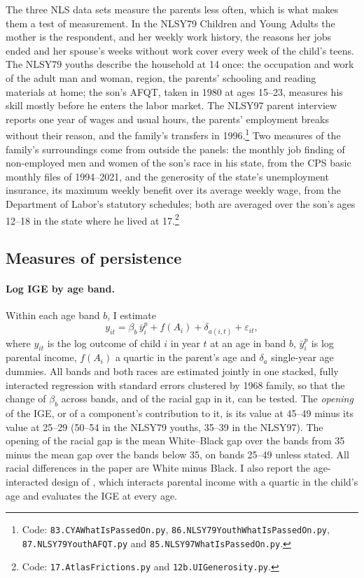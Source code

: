 The three NLS data sets measure the parents less often, which is what makes them a test of measurement. In the NLSY79
Children and Young Adults the mother is the respondent, and her weekly work history, the reasons her jobs ended and her
spouse's weeks without work cover every week of the child's teens. The NLSY79 youths describe the household at 14 once:
the occupation and work of the adult man and woman, region, the parents' schooling and reading materials at home; the
son's AFQT, taken in 1980 at ages 15--23, measures his skill mostly before he enters the labor market. The NLSY97 parent interview reports
one year of wages and usual hours, the parents' employment breaks without their reason, and the family's transfers in
1996.\footnote{Code: \texttt{83.CYAWhatIsPassedOn.py}, \texttt{86.NLSY79YouthWhatIsPassedOn.py},
\texttt{87.NLSY79YouthAFQT.py} and \texttt{85.NLSY97WhatIsPassedOn.py}.} Two measures of the family's surroundings
come from outside the panels: the monthly job finding of non-employed men and women of the son's race in his state,
from the CPS basic monthly files of 1994--2021, and the generosity of the state's unemployment insurance, its maximum
weekly benefit over its average weekly wage, from the Department of Labor's statutory schedules; both are averaged over
the son's ages 12--18 in the state where he lived at 17.\footnote{Code: \texttt{17.AtlasFrictions.py} and
\texttt{12b.UIGenerosity.py}.}

\subsection{Measures of persistence}

\paragraph{Log IGE by age band.} Within each age band $b$, I estimate
\begin{equation}\label{eq:ige}
y_{it} = \beta_{b}\, \bar y^{p}_{i} + f(A_i) + \delta_{a(i,t)} + \varepsilon_{it},
\end{equation}
where $y_{it}$ is the log outcome of child $i$ in year $t$ at an age in band $b$, $\bar y^{p}_{i}$ is log parental
income, $f(A_i)$ a quartic in the parent's age and $\delta_a$ single-year age dummies. All bands and both races are
estimated jointly in one stacked, fully interacted regression with standard errors clustered by 1968 family, so that
the change of $\beta_b$ across bands, and of the racial gap in it, can be tested. The \emph{opening} of the IGE, or of
a component's contribution to it, is its value at 45--49 minus its value at 25--29 (50--54 in the NLSY79 youths, 35--39
in the NLSY97). The opening of the racial gap is the mean White--Black gap over the bands from 35 minus the mean gap
over the bands below 35, on bands 25--49 unless stated. All racial differences in the paper are White minus Black. I also report the age-interacted design of \citet{lee2009trends}, which interacts parental income
with a quartic in the child's age and evaluates the IGE at every age.

